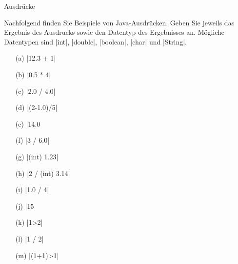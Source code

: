 \begin{exercise}{Ausdrücke}

\begin{body}
Nachfolgend finden Sie Beispiele von Java-Ausdrücken. Geben Sie jeweils das Ergebnis des Ausdrucks sowie den 
Datentyp des Ergebnisses an. Mögliche Datentypen sind \code|int|, \code|double|, \code|boolean|, \code|char| und \code|String|.
\begin{center}
\begin{minipage}{0.3\textwidth}
\begin{itemize}
\item[(a)] \code|12.3 + 1|
\item[(b)] \code|0.5 * 4|
\item[(c)] \code|2.0 / 4.0|
\item[(d)] \code|(2-1.0)/5| 
\item[(e)] \code|14.0 %
\end{itemize}
\end{minipage}
\begin{minipage}{0.3\textwidth}
\begin{itemize}
\item[(f)] \code|3 / 6.0|
\item[(g)] \code|(int) 1.23|
\item[(h)] \code|2 / (int) 3.14|
\item[(i)] \code|1.0 / 4|
\item[(j)] \code|15 %
\end{itemize}
\end{minipage}
\begin{minipage}{0.3\textwidth}
\begin{itemize}
\item[(k)] \code|1>2|
\item[(l)] \code|1 / 2|
\item[(m)] \code|(1+1)>1|
\end{itemize}
\end{minipage}
\end{center}
\end{body}

\begin{solution}


\end{solution}
\end{exercise}
